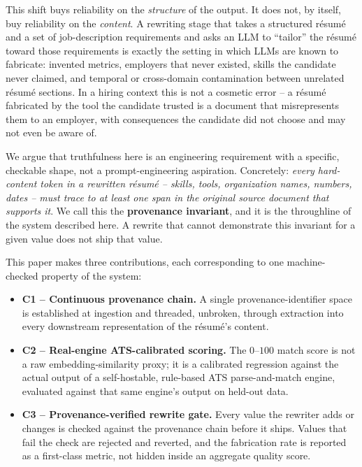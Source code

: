 \documentclass{article}
\begin{document}
This shift buys reliability on the \emph{structure} of the output. It does not, by itself, buy
reliability on the \emph{content}. A rewriting stage that takes a structured résumé and a set of
job-description requirements and asks an LLM to ``tailor'' the résumé toward those requirements is
exactly the setting in which LLMs are known to fabricate: invented metrics, employers that never
existed, skills the candidate never claimed, and temporal or cross-domain contamination between
unrelated résumé sections. In a hiring context this is not a cosmetic error -- a résumé fabricated
by the tool the candidate trusted is a document that misrepresents them to an employer, with
consequences the candidate did not choose and may not even be aware of.

We argue that truthfulness here is an engineering requirement with a specific, checkable shape, not
a prompt-engineering aspiration. Concretely: \emph{every hard-content token in a rewritten résumé --
skills, tools, organization names, numbers, dates -- must trace to at least one span in the
original source document that supports it}. We call this the \textbf{provenance invariant}, and it
is the throughline of the system described here. A rewrite that cannot demonstrate this invariant
for a given value does not ship that value.

This paper makes three contributions, each corresponding to one machine-checked property of the
system:

\begin{itemize}
  \item \textbf{C1 -- Continuous provenance chain.} A single provenance-identifier space is
    established at ingestion and threaded, unbroken, through extraction into every downstream
    representation of the résumé's content.
  \item \textbf{C2 -- Real-engine ATS-calibrated scoring.} The $0$--$100$ match score is not a raw
    embedding-similarity proxy; it is a calibrated regression against the actual output of a
    self-hostable, rule-based ATS parse-and-match engine, evaluated against that same engine's
    output on held-out data.
  \item \textbf{C3 -- Provenance-verified rewrite gate.} Every value the rewriter adds or changes is
    checked against the provenance chain before it ships. Values that fail the check are rejected
    and reverted, and the fabrication rate is reported as a first-class metric, not hidden inside an
    aggregate quality score.
\end{itemize}
\end{document}
